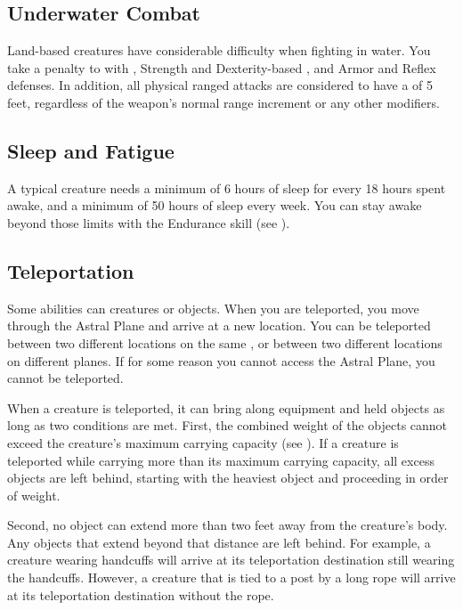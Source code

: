     \subsection{Underwater Combat}\label{Underwater Combat}
        Land-based creatures have considerable difficulty when fighting in water.
        You take a  penalty to  with , Strength and Dexterity-based , and Armor and Reflex defenses.
        In addition, all physical ranged attacks are considered to have a  of 5 feet, regardless of the weapon's normal range increment or any other modifiers.

    \subsection{Sleep and Fatigue}\label{Sleep and Fatigue}
        A typical creature needs a minimum of 6 hours of sleep for every 18 hours spent awake, and a minimum of 50 hours of sleep every week.
        You can stay awake beyond those limits with the Endurance skill (see ).

    \subsection{Teleportation}\label{Teleportation}
        Some abilities can  creatures or objects.
        When you are teleported, you move through the Astral Plane and arrive at a new location.
        You can be teleported between two different locations on the same , or between two different locations on different planes.
        If for some reason you cannot access the Astral Plane, you cannot be teleported.

        When a creature is teleported, it can bring along equipment and held objects as long as two conditions are met.
        First, the combined weight of the objects cannot exceed the creature's maximum carrying capacity (see ).
        If a creature is teleported while carrying more than its maximum carrying capacity, all excess objects are left behind, starting with the heaviest object and proceeding in order of weight.

        Second, no object can extend more than two feet away from the creature's body.
        Any objects that extend beyond that distance are left behind.
        For example, a creature wearing handcuffs will arrive at its teleportation destination still wearing the handcuffs.
        However, a creature that is tied to a post by a long rope will arrive at its teleportation destination without the rope.


